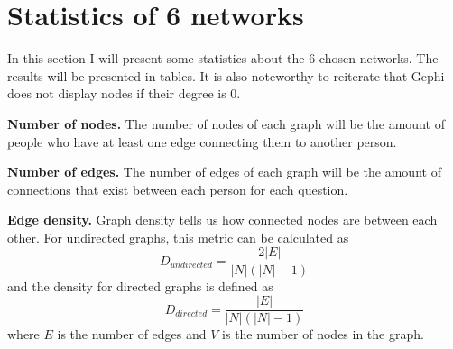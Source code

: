 \section{Statistics of 6 networks}
In this section I will present some statistics about the 6 chosen networks. The results will be presented in tables. It is also noteworthy to reiterate that Gephi does not display nodes if their degree is 0.

\textbf{Number of nodes.} The number of nodes of each graph will be the amount of people who have at least one edge connecting them to another person.

\textbf{Number of edges.} The number of edges of each graph will be the amount of connections that exist between each person for each question.

\textbf{Edge density.} Graph density tells us how connected nodes are between each other. For undirected graphs, this metric can be calculated as
\begin{equation}
    D_{undirected} = \frac{2|E|}{|N|(|N|-1)}
    \label{equation:dir_density}
\end{equation}
and the density for directed graphs is defined as
\begin{equation}
    D_{directed} = \frac{|E|}{|N|(|N    |-1)}
    \label{equation:undir_density}
\end{equation}
where $E$ is the number of edges and $V$ is the number of nodes in the graph.

